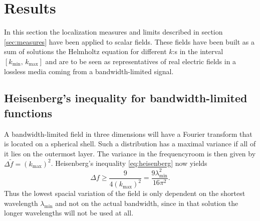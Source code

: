 \documentclass[11pt,a4paper, 
swedish,english %
]{article}
\newcommand{\tf}{\ensuremath{\tilde{f}}}
\begin{document}
\section{Results}
In this section the localization measures and limits described in 
section \ref{sec:measures} have been applied to scalar fields. These 
fields have been built as a sum of solutions the Helmholtz equation for 
different $k$:s in the interval $[k_{\min},\,k_{\max}]$ and are to be 
seen as representatives of real electric fields in a lossless media 
coming from a bandwidth-limited signal.


\subsection{Heisenberg's inequality for bandwidth-limited functions}
A bandwidth-limited field in three dimensions will have a Fourier transform that is located on a spherical
shell. Such a distribution has a maximal variance if all of it lies on the outermost layer. The variance
in the frequencyroom is then given by $\Delta \tf=(k_{\max})^2$. Heisenberg's inequality \eqref{eq:heisenberg}
now yields
\begin{equation}
\Delta f \geq \frac{9}{4(k_{\max})^2}=\frac{9\lambda_{\min}^2}{16\pi^2}.
\end{equation}
Thus the lowest spacial variation of the field is only dependent on the shortest wavelength $\lambda_{\min}$
and not on the actual bandwidth, since in that solution the longer wavelengths will not be used at all.
\end{document}
